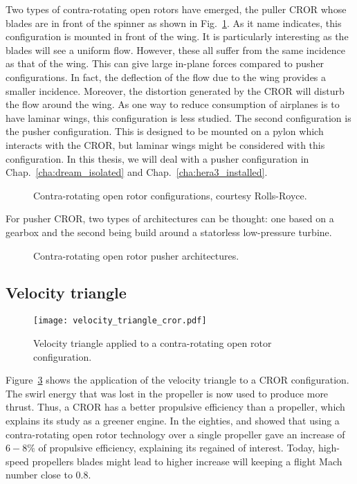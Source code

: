 Two types of contra-rotating open rotors have emerged, the
puller CROR whose blades are in front of the spinner as 
shown in Fig.~\ref{fig:cror_configurations}. As it
name indicates, this configuration is mounted in front of the
wing. It is particularly interesting as the blades will see
a uniform flow. However, these all suffer from the same incidence as that
of the wing. This can give large in-plane forces compared to pusher
configurations. In fact, the deflection of the flow due to the wing provides
a smaller incidence.
Moreover, the distortion generated
by the CROR will disturb the flow around the wing. As one way to reduce
consumption of airplanes is to have laminar wings, this configuration
is less studied. The second configuration is the pusher
configuration. This is designed to be mounted on a pylon which
interacts with the CROR, but laminar wings might be considered with
this configuration. In this thesis, we will deal with a pusher configuration
in Chap.~\ref{cha:dream_isolated} and Chap.~\ref{cha:hera3_installed}.
\begin{figure}[htb]
  \centering
  \caption{Contra-rotating open rotor configurations, courtesy Rolls-Royce.}
  \label{fig:cror_configurations}
\end{figure}

For pusher CROR, two types of architectures can be thought:
one based on a gearbox and the second
being build around a statorless low-pressure turbine.
\begin{figure}[htb]
  \centering
  \caption{Contra-rotating open rotor pusher architectures.}
  \label{fig:cror_architectures}
\end{figure}

\subsection{Velocity triangle}
\label{sub:cror_velocity_triangle}
\begin{figure}[htbp]
  \centering
  \texttt{[image: velocity\_triangle\_cror.pdf]}
  \caption{Velocity triangle applied to a contra-rotating open rotor configuration.}
  \label{fig:velocity_triangle_cror}
\end{figure}
Figure~\ref{fig:velocity_triangle_cror} shows the application
of the velocity triangle to a CROR configuration. The swirl
energy that was lost in the propeller is now used to 
produce more thrust. Thus, a CROR has a better propulsive
efficiency than a propeller, which explains its study as
a greener engine. In the eighties, 
\citet{Strack1981} and \citet{Hager1988} showed that
using a contra-rotating open rotor technology over
a single propeller gave an increase of $6-8\%$
of propulsive efficiency, explaining its regained of interest.
Today, high-speed propellers blades might lead to higher increase
will keeping a flight Mach number close to $0.8$.

